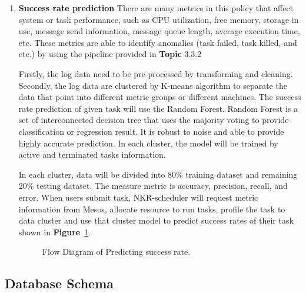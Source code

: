 \documentclass[12pt,oneside,openright,a4paper]{cpe-english-project}
\begin{document}
\begin{enumerate}
\newpage
\item \textbf{Success rate prediction} There are many metrics in this policy that affect system or task performance, such as CPU utilization, free memory, storage in use, message send information, message queue length, average execution time, etc. These metrics are able to identify anomalies (task failed, task killed, and etc.) by using the pipeline provided in \textbf{Topic} 3.3.2
  
\hspace{10mm}Firstly, the log data need to be pre-processed by transforming and cleaning. Secondly, the log data are clustered by K-means algorithm to separate the data that point into different metric groups or different machines. The success rate prediction of given task will use the Random Forest. Random Forest is a set of interconnected decision tree that uses the majority voting to provide classification or regression result. It is robust to noise and able to provide highly accurate prediction. \cite{adaptiveScheduling} In each cluster, the model will be trained by active and terminated tasks information.

\hspace{10mm}In each cluster, data will be divided into 80\% training dataset and remaining 20\% testing dataset. The measure metric is accuracy, precision, recall, and error. When users submit task, NKR-scheduler will request metric information from Mesos, allocate resource to run tasks, profile the task to data cluster and use that cluster model to predict success rates of their task shown in \textbf{Figure}~\ref{fig:flowDiagramPredict}.

  \begin{figure}[!h]\centering
    \setlength{\fboxrule}{0mm} %
    \setlength{\fboxsep}{0cm}
    \caption{Flow Diagram of Predicting success rate.}\label{fig:flowDiagramPredict}
  \end{figure}

\end{enumerate}

\newpage
\subsection{Database Schema}  
\end{document}
